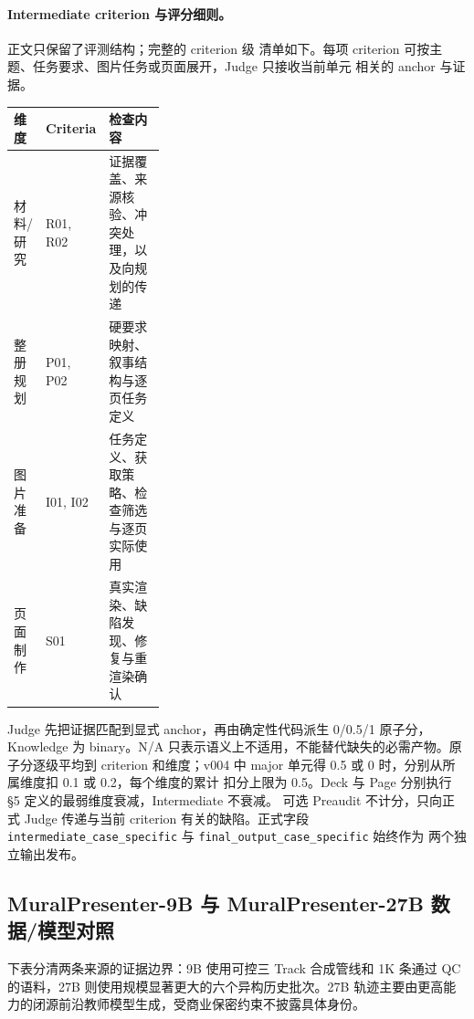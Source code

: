 \paragraph{Intermediate criterion 与评分细则。} 正文只保留了评测结构；完整的 criterion 级
清单如下。每项 criterion 可按主题、任务要求、图片任务或页面展开，Judge 只接收当前单元
相关的 anchor 与证据。

\begin{center}\small
\begin{tabularx}{\linewidth}{@{}p{0.18\linewidth}p{0.15\linewidth}X@{}}
\toprule 维度 & Criteria & 检查内容 \\
\midrule
材料/研究 & R01, R02 & 证据覆盖、来源核验、冲突处理，以及向规划的传递 \\
整册规划 & P01, P02 & 硬要求映射、叙事结构与逐页任务定义 \\
图片准备 & I01, I02 & 任务定义、获取策略、检查筛选与逐页实际使用 \\
页面制作 & S01 & 真实渲染、缺陷发现、修复与重渲染确认 \\
\bottomrule
\end{tabularx}
\end{center}

Judge 先把证据匹配到显式 anchor，再由确定性代码派生 0/0.5/1 原子分，Knowledge 为
binary。N/A 只表示语义上不适用，不能替代缺失的必需产物。原子分逐级平均到 criterion
和维度；v004 中 major 单元得 0.5 或 0 时，分别从所属维度扣 0.1 或 0.2，每个维度的累计
扣分上限为 0.5。Deck 与 Page 分别执行 \S5 定义的最弱维度衰减，Intermediate 不衰减。
可选 Preaudit 不计分，只向正式 Judge 传递与当前 criterion 有关的缺陷。正式字段
\texttt{intermediate\_case\_specific} 与 \texttt{final\_output\_case\_specific} 始终作为
两个独立输出发布。

\subsection{MuralPresenter-9B 与 MuralPresenter-27B 数据/模型对照}

下表分清两条来源的证据边界：9B 使用可控三 Track 合成管线和 1K 条通过 QC 的语料，27B 则使用规模显著更大的六个异构历史批次。27B 轨迹主要由更高能力的闭源前沿教师模型生成，受商业保密约束不披露具体身份。

